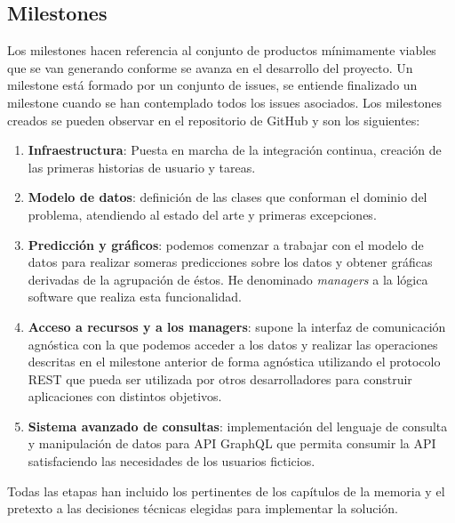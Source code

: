 \subsection{Milestones}
Los milestones hacen referencia al conjunto de productos mínimamente viables que se van
generando conforme se avanza en el desarrollo del proyecto. Un milestone está formado por
un conjunto de issues, se entiende finalizado un milestone cuando se han contemplado todos
los issues asociados. Los milestones creados se pueden observar en el repositorio de
GitHub y son los siguientes:
\begin{enumerate}
    \item \textbf{Infraestructura}: Puesta en marcha de la integración continua, creación
    de las primeras historias de usuario y tareas.
    \item \textbf{Modelo de datos}: definición de las clases que conforman el dominio del
    problema, atendiendo al estado del arte y primeras excepciones. 
    \item \textbf{Predicción y gráficos}: podemos comenzar a trabajar con el modelo de
    datos para realizar someras predicciones sobre los datos y obtener gráficas derivadas
    de la agrupación de éstos. He denominado \textit{managers} a la lógica software que
    realiza esta funcionalidad.
    \item \textbf{Acceso a recursos y a los managers}: supone la interfaz de comunicación
    agnóstica con la que podemos acceder a los datos y realizar las operaciones descritas
    en el milestone anterior de forma agnóstica utilizando el protocolo REST que pueda ser
    utilizada por otros desarrolladores para construir aplicaciones con distintos
    objetivos.
    \item \textbf{Sistema avanzado de consultas}: implementación del lenguaje de consulta
    y manipulación de datos para API GraphQL que permita consumir la API satisfaciendo las
    necesidades de los usuarios ficticios.
\end{enumerate}

Todas las etapas han incluido los pertinentes de los capítulos de la memoria y el pretexto
a las decisiones técnicas elegidas para implementar la solución.


